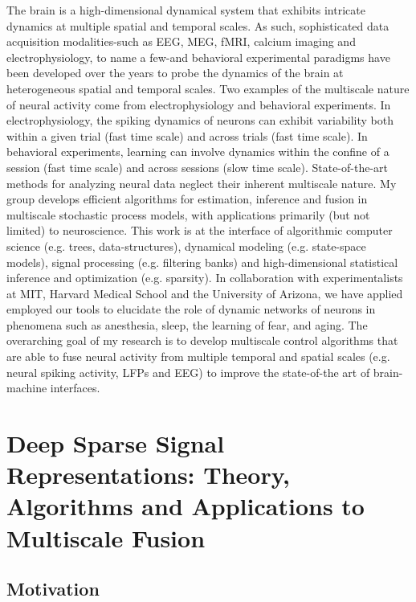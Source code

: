 \documentclass[12pt]{article}
\begin{document}
The brain is a high-dimensional dynamical system that exhibits intricate dynamics at multiple spatial and temporal scales. As such, sophisticated data acquisition modalities-such as EEG, MEG, fMRI, calcium imaging and electrophysiology, to name a few-and behavioral experimental paradigms have been developed over the years to probe the dynamics of the brain at heterogeneous spatial and temporal scales. Two examples of the multiscale nature of neural activity come from electrophysiology and behavioral experiments. In electrophysiology, the spiking dynamics of neurons can exhibit variability both within a given trial (fast time scale) and across trials (fast time scale). In behavioral experiments, learning can involve dynamics within the confine of a session (fast time scale) and across sessions (slow time scale). State-of-the-art methods for analyzing neural data neglect their inherent multiscale nature.  My group develops efficient algorithms for estimation, inference and fusion in multiscale stochastic process models, with applications primarily (but not limited) to neuroscience. This work is at the interface of algorithmic computer science (e.g. trees, data-structures), dynamical modeling (e.g. state-space models), signal processing (e.g. filtering banks) and high-dimensional statistical inference and optimization (e.g. sparsity). In collaboration with experimentalists at MIT, Harvard Medical School and the University of Arizona, we have applied employed our tools to elucidate the role of dynamic networks of neurons in phenomena such as anesthesia, sleep, the learning of fear, and aging. The overarching goal of my research is to develop multiscale control algorithms that are able to fuse neural activity from multiple temporal and spatial scales (e.g. neural spiking activity, LFPs and EEG) to improve the state-of-the art of brain-machine interfaces.



\section*{Deep Sparse Signal Representations: Theory, Algorithms and Applications to Multiscale Fusion}

\subsection*{Motivation}
\end{document}
